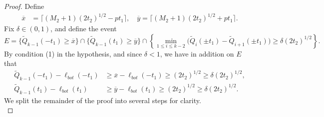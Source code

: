 	\begin{proof}
	
	Define 
	\begin{align*}
	\overline{x} &= \lceil (M_2+1)(2t_2)^{1/2} - pt_1\rceil, \quad
	\overline{y} = \lceil(M_2+1)(2t_2)^{1/2} + pt_1\rceil.
	\end{align*}
	Fix $\delta \in (0,1)$, and define the event 
	\[
	E = \big\{\widetilde{Q}_{k-1}(-t_1) \geq \overline{x} \big\} \cap \big\{\widetilde{Q}_{k-1}(t_1) \geq \overline{y} \big\} \cap \left\{\min_{1\leq i\leq k-2} \big(\widetilde{Q}_i(\pm t_1) - \widetilde{Q}_{i+1}(\pm t_1)\big) \geq \delta(2t_2)^{1/2}\right\}.
	\]
	By condition (1) in the hypothesis, and since $\delta < 1$, we have in addition on $E$ that
	\begin{align*}
	\widetilde{Q}_{k-1}(-t_1) - \ell_{bot}(- t_1) &\geq \overline{x} - \ell_{bot}(- t_1) \geq (2t_2)^{1/2} \geq \delta(2t_2)^{1/2},\\
	\widetilde{Q}_{k-1}(t_1) - \ell_{bot}(t_1) &\geq \overline{y} - \ell_{bot}(t_1) \geq (2t_2)^{1/2} \geq \delta(2t_2)^{1/2}.
	\end{align*}
	We split the remainder of the proof into several steps for clarity.\\
		

\end{proof}
